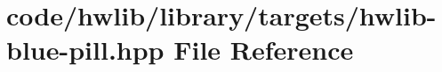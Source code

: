 \hypertarget{hwlib-blue-pill_8hpp}{}\section{code/hwlib/library/targets/hwlib-\/blue-\/pill.hpp File Reference}
\label{hwlib-blue-pill_8hpp}
